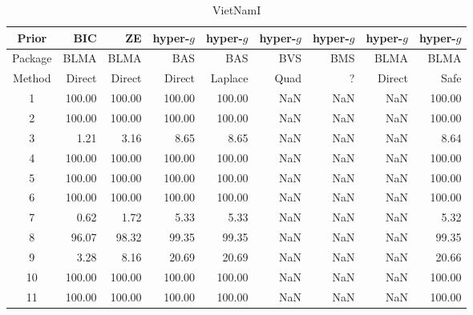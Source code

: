 \begin{table}[ht]
	\centering
	\begin{tabular}{c|r|r|rrrrrr}
		Prior   & BIC    & ZE     & hyper-$g$ & hyper-$g$ & hyper-$g$  & hyper-$g$ & hyper-$g$ & hyper-$g$ \\
		\hline 
		Package & BLMA   & BLMA   & BAS       & BAS       & BVS        & BMS       & BLMA      & BLMA       \\
		\hline 
		Method  & Direct & Direct & Direct    & Laplace   & Quad & ?         & Direct    & Safe      \\ 
		\hline
		1 & 100.00 & 100.00 & 100.00 & 100.00 & NaN & NaN  & NaN & 100.00 \\ 
		2 & 100.00 & 100.00 & 100.00 & 100.00 & NaN & NaN & NaN  & 100.00 \\ 
		3 & 1.21   & 3.16   & 8.65   & 8.65   & NaN & NaN & NaN   & 8.64 \\ 
		4 & 100.00 & 100.00 & 100.00 & 100.00 & NaN & NaN & NaN & 100.00 \\ 
		5 & 100.00 & 100.00 & 100.00 & 100.00 & NaN & NaN & NaN & 100.00 \\ 
		6 & 100.00 & 100.00 & 100.00 & 100.00 & NaN & NaN & NaN & 100.00 \\ 
		7 & 0.62   & 1.72   & 5.33   & 5.33   & NaN & NaN & NaN & 5.32 \\ 
		8 & 96.07  & 98.32  & 99.35  & 99.35  & NaN & NaN & NaN & 99.35 \\ 
		9 & 3.28    & 8.16  & 20.69  & 20.69  & NaN & NaN & NaN & 20.66 \\ 
		10 & 100.00 & 100.00 & 100.00 & 100.00 & NaN & NaN & NaN & 100.00 \\ 
		11 & 100.00 & 100.00 & 100.00 & 100.00 & NaN & NaN & NaN & 100.00 \\ 
		\hline
	\end{tabular}
	\caption{VietNamI}
	\label{tab:VietNamIResults1}
\end{table}

